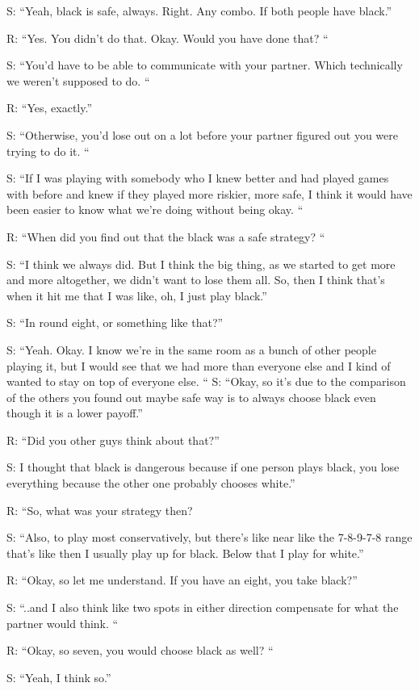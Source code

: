 \documentclass[a4paper,superscriptaddress,nofootinbib]{revtex4}
\begin{document}
S: “Yeah, black is safe, always. Right. Any combo. If both people have black.” 

R: “Yes. You didn't do that. Okay. Would you have done that? “

S: “You'd have to be able to communicate with your partner. Which technically we weren't supposed to do. “

R: “Yes, exactly.”

S: “Otherwise, you'd lose out on a lot before your partner figured out you were trying to do it. “

S: “If I was playing with somebody who I knew better and had played games with before and knew if they played more riskier, more safe, I think it would have been easier to know what we're doing without being okay. “

R: “When did you find out that the black was a safe strategy? “

S: “I think we always did. But I think the big thing, as we started to get more and more altogether, we didn't want to lose them all. So, then I think that's when it hit me that I was like, oh, I just play black.”

S: “In round eight, or something like that?”

S: “Yeah. Okay. I know we're in the same room as a bunch of other people playing it, but I would see that we had more than everyone else and I kind of wanted to stay on top of everyone else. “
S: “Okay, so it's due to the comparison of the others you found out maybe safe way is to always choose black even though it is a lower payoff.”

R: “Did you other guys think about that?” 

S: I thought that black is dangerous because if one person plays black, you lose everything because the other one probably chooses white.”

R: “So, what was your strategy then? 

S: “Also, to play most conservatively, but there's like near like the 7-8-9-7-8 range that's like then I usually play up for black. Below that I play for white.” 

R: “Okay, so let me understand. If you have an eight, you take black?”

S: “..and I also think like two spots in either direction compensate for what the partner would think. “

R: “Okay, so seven, you would choose black as well? “

S: “Yeah, I think so.”
\end{document}
